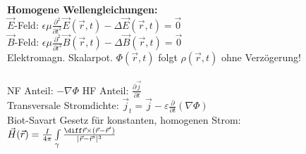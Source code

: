 \textbf{Homogene Wellengleichungen:}\\
$\vec E$-Feld: $\epsilon \mu \frac{\partial^2}{\partial t^2} \vec E (\vec r, t) - \Delta \vec E (\vec r, t) = \vec 0$\\
$\vec B$-Feld: $\epsilon \mu \frac{\partial^2}{\partial t^2} \vec B (\vec r, t) - \Delta \vec B (\vec r, t) = \vec 0$\\
Elektromagn. Skalarpot. $\Phi(\vec r,t)$ folgt $\rho(\vec r, t)$ ohne Verzögerung!\\
\\
NF Anteil: $-\nabla \Phi$ \qquad HF Anteil: $\frac{\partial \vec j}{\partial t}$\\
Transversale Stromdichte: $\vec j_t = \vec j - \varepsilon\frac{\partial}{\partial t} (\nabla \Phi)$\\

Biot-Savart Gesetz für konstanten, homogenen Strom:\\
$\vec H(\vec r) = \frac{I}{4 \pi } \int\limits_\gamma \frac{\diff \vec r \times (\vec r - \vec r')}{|\vec r - \vec r'|^3}$\\
